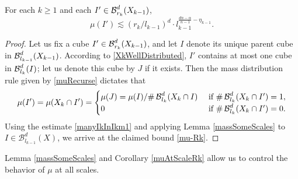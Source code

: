 \begin{corollary}\label{muAtScaleRk}
	For each $k\geq 1$ and each $I' \in \operatorname{\mathcal{B}}^d_{r_k} (X_{k-1})$, 
	\begin{equation} 
	\mu(I') \lesssim (r_k/l_{k-1})^d \cdot l_{k-1}^{\frac{dn-\alpha}{n-1}-\eta_{k-1}}. \label{mu-Rk}
	\end{equation} 
\end{corollary}
\begin{proof}
Let us fix a cube $I' \in \operatorname{\mathcal{B}}^d_{r_k}(X_{k-1})$, and let $I$ denote its unique parent cube in $\operatorname{\mathcal{B}}_{l_{k-1}}^d (X_{k-1})$. According to \eqref{XkWellDistributed}, $I'$ contains at most one cube in $\operatorname{\mathcal{B}}_{l_k}^d(I)$; let us denote this cube by $J$ if it exists. Then the mass distribution rule given by \eqref{muRecurse} dictates that 
\begin{align*}
\mu(I') = \mu(X_k \cap I') = \begin{cases} \mu(J) = {\mu(I)}/{\# \operatorname{\mathcal{B}}_{l_k}^d(X_k \cap I)}  &\text{ if } \# \operatorname{\mathcal{B}}_{l_k}^d(X_k \cap I') = 1, \\ 0 &\text{ if } \# \operatorname{\mathcal{B}}_{l_k}^d(X_k \cap I') = 0. \end{cases} 
\end{align*} 
Using the estimate \eqref{manyIkInIkm1} and applying Lemma \ref{massSomeScales} to $I \in \mathcal B_{l_{k-1}}^d(X)$, we arrive at the claimed bound \eqref{mu-Rk}. 
\end{proof}
Lemma \ref{massSomeScales} and Corollary \ref{muAtScaleRk} allow us to control the behavior of $\mu$ at all scales. %

